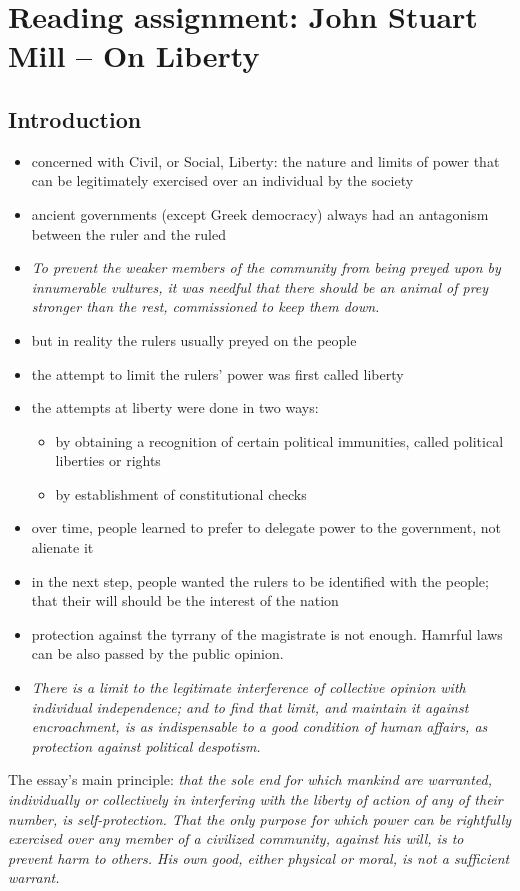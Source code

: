 \section{Reading assignment: John Stuart Mill -- On Liberty}

\subsection{Introduction}

\begin{itemize}
	\item concerned with Civil, or Social, Liberty: the nature and limits
	of power that can be legitimately exercised over an individual by the
	society
	\item ancient governments (except Greek democracy) always had an
	antagonism between the ruler and the ruled
	\item \textit{To prevent the weaker members of the community
	from being preyed upon by innumerable vultures, it
	was needful that there should be an animal of prey
	stronger than the rest, commissioned to keep them
	down.}
	\item but in reality the rulers usually preyed on the people
	\item the attempt to limit the rulers' power was first called liberty
	\item the attempts at liberty were done in two ways:
	\begin{itemize}
		\item by obtaining a recognition of certain political
		immunities, called political liberties or rights
		\item by establishment of constitutional checks
	\end{itemize}
	\item over time, people learned to prefer to delegate power to the
	government, not alienate it
	\item in the next step, people wanted the rulers to be identified with
	the people; that their will should be the interest of the nation
	\item protection against the tyrrany of the magistrate is not enough.
	Hamrful laws can be also passed by the public opinion.
	\item \textit{There is a limit to the legitimate
	interference of collective opinion with individual independence; and
	to find that limit, and maintain it against encroachment, is as
	indispensable to a good condition of human affairs, as protection
	against political despotism.}
\end{itemize}

The essay's main principle: \textit{that the sole end for which mankind are
warranted, individually or collectively in interfering with the liberty of
action of any of their number, is self-protection. That the only purpose for
which power can be rightfully exercised over any member of a civilized
community, against his will, is to prevent harm to others. His own good,
either physical or moral, is not a sufficient warrant.}

